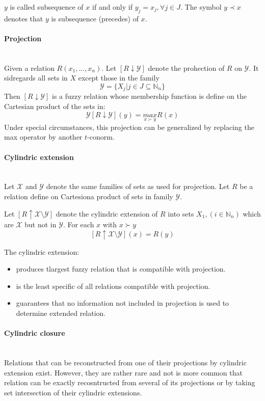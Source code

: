\documentclass{article}
\begin{document}
$y$ is called subsequence of $x$ if and only if $y_j=x_j,\forall j\in J$. The symbol $y\prec x$ denotes
that $y$ is subsequence (precedes) of $x$.

\paragraph{Projection}\mbox{}\\
Given a relation $R(x_1,...,x_n)$. Let $[R\downarrow\mathcal{Y}]$ denote the prohection of $R$ on $\mathcal{Y}$.
It sidregards all sets in $X$ except those in the family
$$\mathcal{Y}=\{X_j|j\in J\subseteq\mathbb{N}_n\}$$
Then $[R\downarrow\mathcal{Y}]$ is a fuzzy relation whose membership function is define on the Cartesian
product of the sets in:
$$\mathcal{Y}[R\downarrow\mathcal{Y}](y)=\underset{x\succ y}{max }R(x)$$
Under special circumstances, this projection can be generalized by replacing the max operator by another
$t$-conorm.

\paragraph{Cylindric extension}\mbox{}\\
Let $\mathcal{X}$ and $\mathcal{Y}$ denote the same families of sets as used for projection. Let
$R$ be a relation define on Cartesiona product of sets in family $\mathcal{Y}$.

Let $[R\uparrow\mathcal{X}\setminus\mathcal{Y}]$ denote the cylindric extension of $R$ into sets
$X_1,(i\in\mathbb{N}_n)$ which are $\mathcal{X}$ but not in $\mathcal{Y}$. For each $x$ with
$x\succ y$
$$[R\uparrow\mathcal{X}\setminus\mathcal{Y}](x)= R(y)$$

The cylindric extension:
\begin{itemize}
    \item produces tlargest fuzzy relation that is compatible with projection.
    \item is the least specific of all relations compatible with projection.
    \item guarantees that no information not included in projection is used to determine extended relation.
\end{itemize}

\paragraph{Cylindric closure}\mbox{}\\
Relations that can be reconstructed from one of their projections by cylindric extension exist. However,
they are rather rare and not is more common that relation can be exactly recosntructed from several
of its projections or by taking set intersection of their cylindric extensions.
\end{document}
